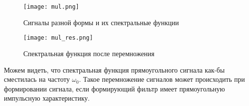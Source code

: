 \begin{figure}[H]
    \centering
    \texttt{[image: mul.png]}
    \caption{Сигналы разной формы и их спектральные функции}
\end{figure}

\begin{figure}[H]
    \centering
    \texttt{[image: mul\_res.png]}
    \caption{Спектральная функция после перемножения}
\end{figure}

Можем видеть, что спектральная функция прямоугольного сигнала как-бы сместилась на частоту $\omega_0$. Такое перемножение сигналов
может происходить при формировании сигнала, если формирующий фильтр имеет прямоугольную импульсную характеристику.

\endinput